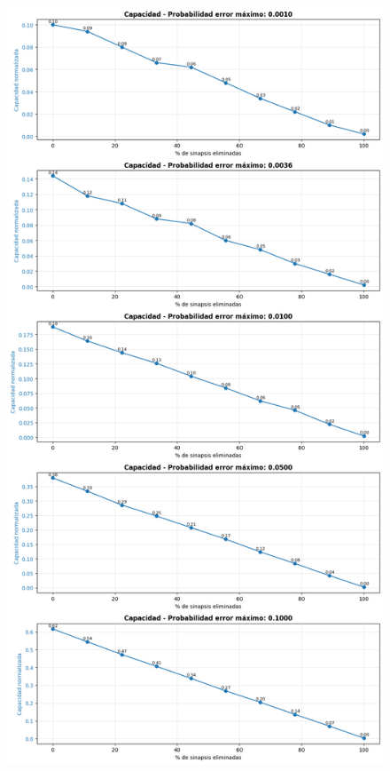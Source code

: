 \documentclass[11pt]{article} %
\begin{document}
\newpage
\clearpage
\begin{figure}[h!]
	\centering
	\includegraphics[width=0.79\linewidth]{imgs/ej3_cap}
	\caption[Capacidades vs Sinapsis eliminadas - 500 neuronas]{}
	\label{fig:ej3cap}
\end{figure}
\newpage
\clearpage
\end{document}
